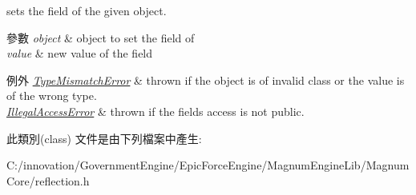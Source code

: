 sets the field of the given object. 


\begin{DoxyParams}{參數}
{\em object} & object to set the field of \\
\hline
{\em value} & new value of the field \\
\hline
\end{DoxyParams}

\begin{DoxyExceptions}{例外}
{\em \hyperlink{classagm_1_1reflection_1_1_type_mismatch_error}{Type\+Mismatch\+Error}} & thrown if the object is of invalid class or the value is of the wrong type. \\
\hline
{\em \hyperlink{classagm_1_1reflection_1_1_illegal_access_error}{Illegal\+Access\+Error}} & thrown if the field\textquotesingle{}s access is not public. \\
\hline
\end{DoxyExceptions}


此類別(class) 文件是由下列檔案中產生\+:\begin{DoxyCompactItemize}
\item 
C\+:/innovation/\+Government\+Engine/\+Epic\+Force\+Engine/\+Magnum\+Engine\+Lib/\+Magnum\+Core/reflection.\+h\end{DoxyCompactItemize}
